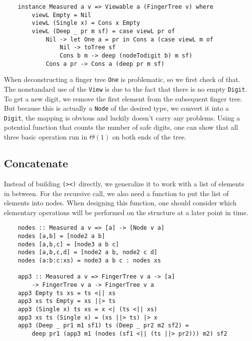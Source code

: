 \begin{verbatim}
    instance Measured a v => Viewable a (FingerTree v) where
        viewL Empty = Nil
        viewL (Single x) = Cons x Empty
        viewL (Deep _ pr m sf) = case viewL pr of
            Nil -> let One a = pr in Cons a (case viewL m of
                Nil -> toTree sf
                Cons b m -> deep (nodeTodigit b) m sf)
            Cons a pr -> Cons a (deep pr m sf)
\end{verbatim}

When deconstructing a finger tree \texttt{One} is problematic, so we first check of that. The nonstandard use of the \texttt{View} is due to the fact that there is no empty \texttt{Digit}. To get a new digit, we remove the first element from the subsequent finger tree. But because this is actually a \texttt{Node} of the desired type, we convert it into a \texttt{Digit}, the mapping is obvious and luckily doesn't carry any problems. Using a potential function that counts the number of safe digits, one can show that all three basic operation run in \(\Theta(1)\) on both ends of the tree.\par

\subsection{Concatenate}

Instead of building \texttt{(><)} directly, we generalize it to work with a list of elements in between. For the recursive call, we also need a function to put the list of elements into nodes. When designing this function, one should consider which elementary operations will be performed on the structure at a later point in time.

\begin{verbatim}
    nodes :: Measured a v => [a] -> [Node v a]
    nodes [a,b] = [node2 a b]
    nodes [a,b,c] = [node3 a b c]
    nodes [a,b,c,d] = [node2 a b, node2 c d]
    nodes (a:b:c:xs) = node3 a b c : nodes xs

    app3 :: Measured a v => FingerTree v a -> [a]
        -> FingerTree v a -> FingerTree v a
    app3 Empty ts xs = ts <|| xs
    app3 xs ts Empty = xs ||> ts
    app3 (Single x) ts xs = x <| (ts <|| xs)
    app3 xs ts (Single x) = (xs ||> ts) |> x
    app3 (Deep _ pr1 m1 sf1) ts (Deep _ pr2 m2 sf2) =
        deep pr1 (app3 m1 (nodes (sf1 <|| (ts ||> pr2))) m2) sf2
\end{verbatim}

